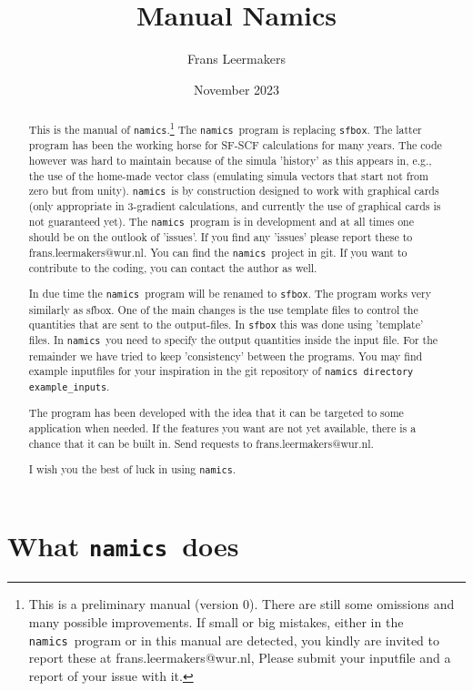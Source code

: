 \documentclass{article}
\title{Manual Namics}
\author{Frans Leermakers}
\date{November 2023}
\newcommand{\namics}{{\tt namics}}
\begin{document}
\maketitle 

\begin{abstract}
This is the manual of \namics.\footnote{This is a preliminary manual (version 0). There are still some omissions and many possible improvements. If small or big mistakes, either in the \namics\ program or in this manual are detected, you kindly are invited to report these at frans.leermakers@wur.nl, Please submit your inputfile and a report of your issue with it.}  The \namics\ program is replacing {\tt sfbox}. The latter program has been the working horse for SF-SCF calculations for many years. The code however was hard to maintain because of the simula 'history' as this appears in, e.g., the use of the home-made vector class (emulating simula vectors that start not from zero but from unity). \namics\ is by construction designed to work with graphical cards (only appropriate in 3-gradient calculations, and currently the use of graphical cards is not guaranteed yet). The \namics\ program is in development and at all times one should be on the outlook of 'issues'. If you find any 'issues' please report these to frans.leermakers@wur.nl. You can find the \namics\ project in git. If you want to contribute to the coding, you can contact the author as well. 

In due time the \namics\ program will be renamed to {\tt sfbox}. The program works very similarly as sfbox. One of the main changes is the use template files to control the quantities that are sent to the output-files. In {\tt sfbox} this was done using 'template' files. In \namics\ you need to specify the output quantities inside the input file. For the remainder we have tried to keep 'consistency' between the programs. You may find example inputfiles for your inspiration in the git repository of \namics\ {\tt directory example\_inputs}. 

The program has been developed with the idea that it can be targeted to some application when needed.  If the  features you want are not yet available, there is a chance that it can be built in. Send requests to frans.leermakers@wur.nl.

I wish you the best of luck in using \namics.
\newpage
\tableofcontents
\newpage
\end{abstract}
\section{What \namics\ does} 
\end{document}
